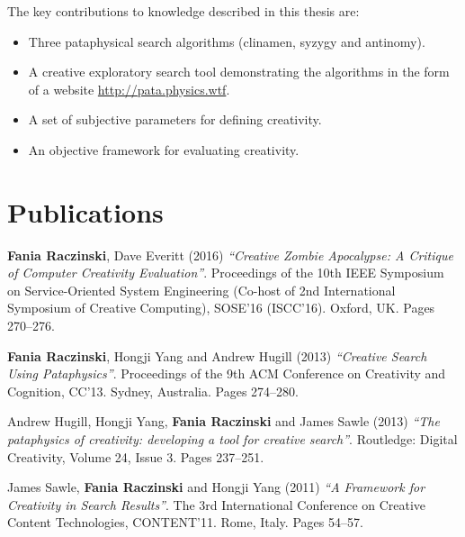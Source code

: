 The key contributions to knowledge described in this thesis are:

\begin{itemize}
  \item Three pataphysical search algorithms (clinamen, syzygy and antinomy).
  \item A creative exploratory search tool demonstrating the algorithms in the form of a website \url{http://pata.physics.wtf}.
  \item A set of subjective parameters for defining creativity.
  \item An objective framework for evaluating creativity.
\end{itemize}

\begin{comment}
  abusing tech in creative ways can yield useful results
  pataphysics = Creativity

  combining the pseudo philosophy of pataphysics with sematically structured algorithms which use programming APIs and computational linguistics to produce original creative works.

  overturn expectations
  subvert browsing
  undermine relevance
  corrupt results
\end{comment}


\section{Publications}

\textbf{Fania Raczinski}, Dave Everitt (2016) \emph{``Creative Zombie Apocalypse: A Critique of Computer Creativity Evaluation''}. Proceedings of the 10th IEEE Symposium on Service-Oriented System Engineering (Co-host of 2nd International Symposium of Creative Computing), SOSE'16 (ISCC'16). Oxford, UK. Pages 270--276.

\textbf{Fania Raczinski}, Hongji Yang and Andrew Hugill (2013) \emph{``Creative Search Using Pataphysics''}. Proceedings of the 9th ACM Conference on Creativity and Cognition, CC'13. Sydney, Australia. Pages 274--280.

Andrew Hugill, Hongji Yang, \textbf{Fania Raczinski} and James Sawle (2013) \emph{``The pataphysics of creativity: developing a tool for creative search''}. Routledge: Digital Creativity, Volume 24, Issue 3. Pages 237--251.

James Sawle, \textbf{Fania Raczinski} and Hongji Yang (2011) \emph{``A Framework for Creativity in Search Results''}. The 3rd International Conference on Creative Content Technologies, CONTENT'11. Rome, Italy. Pages 54--57.

